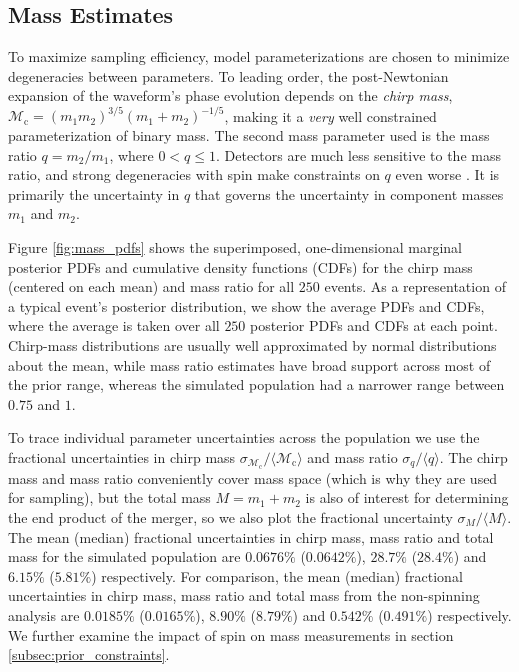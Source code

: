 \subsection{Mass Estimates}\label{sec:mass}
To maximize sampling efficiency, model parameterizations are chosen to minimize degeneracies between parameters.  To leading order, the post-Newtonian expansion of the waveform's phase evolution depends on the \textit{chirp mass}, $\mathcal{M}_\mathrm{c} = (m_1 m_2)^{3/5} (m_1 + m_2)^{-1/5}$, making it a \textit{very} well constrained parameterization of binary mass.  The second mass parameter used is the mass ratio $q = m_2/m_1$, where $0 < q \leq 1$.  Detectors are much less sensitive to the mass ratio, and strong degeneracies with spin make constraints on $q$ even worse \citep{Cutler_1994}.  It is primarily the uncertainty in $q$ that governs the uncertainty in component masses $m_1$ and $m_2$.

Figure \ref{fig:mass_pdfs} shows the superimposed, one-dimensional marginal posterior PDFs and cumulative density functions (CDFs) for the chirp mass (centered on each mean) and mass ratio for all $250$ events.  As a representation of a typical event's posterior distribution, we show the average PDFs and CDFs, where the average is taken over all $250$ posterior PDFs and CDFs at each point. Chirp-mass distributions are usually well approximated by normal distributions about the mean, while mass ratio estimates have broad support across most of the prior range, whereas the simulated population had a narrower range between $0.75$ and $1$.

To trace individual parameter uncertainties across the population we use the fractional uncertainties in chirp mass $\sigma_{\mathcal{M}_\mathrm{c}}/\langle\mathcal{M}_\mathrm{c}\rangle$ and mass ratio $\sigma_q/\langle q\rangle$. The chirp mass and mass ratio conveniently cover mass space (which is why they are used for sampling), but the total mass $M = m_1 + m_2$ is also of interest for determining the end product of the merger, so we also plot the fractional uncertainty $\sigma_M/\langle M\rangle$. The mean (median) fractional uncertainties in chirp mass, mass ratio and total mass for the simulated population are $0.0676\%$ ($0.0642\%$), $28.7\%$ ($28.4\%$) and $6.15\%$ ($5.81\%$) respectively. For comparison, the mean (median) fractional uncertainties in chirp mass, mass ratio and total mass from the non-spinning analysis are $0.0185\%$ ($0.0165\%$), $8.90\%$ ($8.79\%$) and $0.542\%$ ($0.491\%$) respectively.  We further examine the impact of spin on mass measurements in section \ref{subsec:prior_constraints}.


